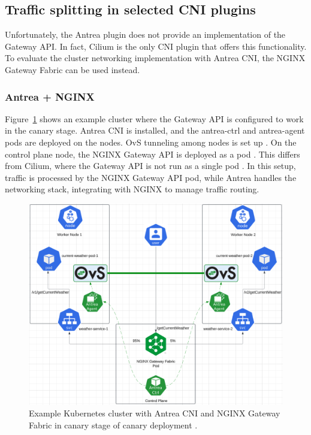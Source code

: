
\subsection{Traffic splitting in selected CNI plugins}
\label{subsection:trafficSplitting}

Unfortunately, the Antrea plugin does not provide an implementation of the Gateway API. In fact, Cilium is the only CNI plugin that offers this functionality. To evaluate the cluster networking implementation with Antrea CNI, the NGINX Gateway Fabric can be used instead.



\subsubsection{Antrea + NGINX}
\label{subsection:antreaIngress}

Figure~\ref{fig:canaryAntreaImg} shows an example cluster where the Gateway API is configured to work in the canary stage. Antrea CNI is installed, and the antrea-ctrl and antrea-agent pods are deployed on the nodes. OvS tunneling among nodes is set up \cite{AntreaDocs}. On the control plane node, the NGINX Gateway API is deployed as a pod \cite{NGINX}. This differs from Cilium, where the Gateway API is not run as a single pod \cite{CiliumDocs}. In this setup, traffic is processed by the NGINX Gateway API pod, while Antrea handles the networking stack, integrating with NGINX to manage traffic routing.

\begin{figure}[H]
    \centering
    \includegraphics[width=1\columnwidth]{images/antrea-nginx.png}
    \caption{Example Kubernetes cluster with Antrea CNI and NGINX Gateway Fabric in canary stage of canary deployment \cite{KubernetesDocs}\cite{AntreaDocs}.}
    \label{fig:canaryAntreaImg}
\end{figure}

